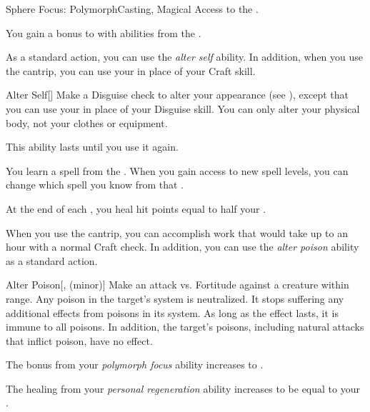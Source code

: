     \begin{feat}{Sphere Focus: Polymorph}{Casting, Magical}
        \featpre Access to the  .

         You gain a  bonus to  with abilities from the  .

         As a standard action, you can use the \textit{alter self} ability.
        In addition, when you use the  cantrip, you can use your  in place of your Craft skill.
        \begin{freeability}{Alter Self}[]
            Make a Disguise check to alter your appearance (see ), except that you can use your  in place of your Disguise skill.
            You can only alter your physical body, not your clothes or equipment.

            This ability lasts until you use it again.
        \end{freeability}

         You learn a spell from the  .
        When you gain access to new spell levels, you can change which spell you know from that .

         At the end of each , you heal hit points equal to half your .

         When you use the  cantrip, you can accomplish work that would take up to an hour with a normal Craft check.
        In addition, you can use the \textit{alter poison} ability as a standard action.
        \begin{apability}{Alter Poison}[,  (minor)]
            Make an attack vs. Fortitude against a creature within \rngclose range.
            \hit Any poison in the target's system is neutralized.
            It stops suffering any additional effects from poisons in its system.
            As long as the effect lasts, it is immune to all poisons.
            In addition, the target's  poisons, including natural attacks that inflict poison, have no effect.
        \end{apability}

         The bonus from your \textit{polymorph focus} ability increases to .

         The healing from your \textit{personal regeneration} ability increases to be equal to your .
    \end{feat}

